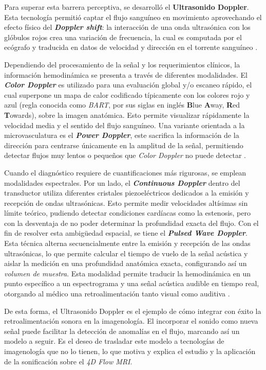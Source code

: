 Para superar esta barrera perceptiva, se desarrolló el \textbf{Ultrasonido Doppler}. Esta tecnología permitió captar el flujo sanguíneo en movimiento aprovechando el efecto físico del \textbf{\textit{Doppler shift}}: la interacción de una onda ultrasónica con los glóbulos rojos crea una variación de frecuencia, la cual es computada por el ecógrafo y traducida en datos de velocidad y dirección en el torrente sanguíneo \cite{GOFFI2025217}.

Dependiendo del procesamiento de la señal y los requerimientos clínicos, la información hemodinámica se presenta a través de diferentes modalidades. El \textit{\textbf{Color Doppler}} es utilizado para una evaluación global y/o escaneo rápido, el cual superpone un mapa de calor codificado típicamente con los colores rojo y azul (regla conocida como \textit{BART}, por sus siglas en inglés \textbf{B}lue \textbf{A}way, \textbf{R}ed \textbf{T}owards), sobre la imagen anatómica. Esto permite visualizar rápidamente la velocidad media y el sentido del flujo sanguíneo. Una variante orientada a la microvasculatura es el \textit{\textbf{Power Doppler}}, este sacrifica la información de la dirección para centrarse únicamente en la amplitud de la señal, permitiendo detectar flujos muy lentos o pequeños que \textit{Color Doppler} no puede detectar \cite{Rubin1994}.

Cuando el diagnóstico requiere de cuantificaciones más rigurosas, se emplean modalidades espectrales. Por un lado, el \textit{\textbf{Continuous Doppler}} dentro del transductor utiliza diferentes cristales piezoeléctricos dedicados a la emisión y recepción de ondas ultrasónicas. Esto permite medir velocidades altísimas sin límite teórico, pudiendo detectar condiciones cardíacas como la estenosis, pero con la desventaja de no poder determinar la profundidad exacta del flujo. Con el fin de resolver esta ambigüedad espacial, se tiene el \textbf{\textit{Pulsed Wave Doppler}}. Esta técnica alterna secuencialmente entre la emisión y recepción de las ondas ultrasónicas, lo que permite calcular el tiempo de vuelo de la señal acústica y aislar la medición en una profundidad anatómica exacta, configurando así un \textit{volumen de muestra}. Esta modalidad permite traducir la hemodinámica en un punto específico a un espectrograma y una señal acústica audible en tiempo real, otorgando al médico una retroalimentación tanto visual como auditiva \cite{Oglat2018}.


De esta forma, el Ultrasonido Doppler es el ejemplo de cómo integrar con éxito la retroalimentación sonora en la imagenología. El incorporar el sonido como nueva señal puede facilitar la detección de anomalías en el flujo, marcando así un modelo a seguir. Es el deseo de trasladar este modelo a tecnologías de imagenología que no lo tienen, lo que motiva y explica el estudio y la aplicación de la sonificación sobre el \textit{4D Flow MRI}.


